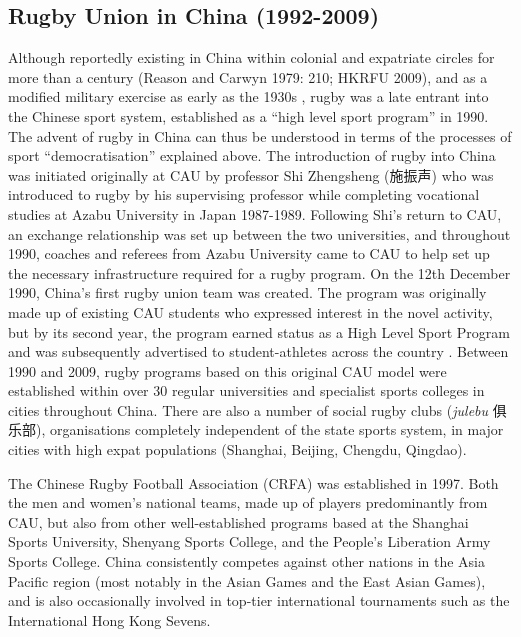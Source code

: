 {    \subsection{Rugby Union in China (1992-2009)}
Although reportedly existing in China within colonial and expatriate circles for more than a century (Reason and Carwyn 1979: 210; HKRFU 2009), and as a modified military exercise as early as the 1930s \citep[135]{Morris2004}, rugby was a late entrant into the Chinese sport system, established as a ``high level sport program'' in 1990.  The advent of rugby in China can thus be understood in terms of the processes of sport ``democratisation'' explained above.  The introduction of rugby into China was initiated originally at CAU by professor Shi Zhengsheng (施振声) who was introduced to rugby by his
supervising professor while completing vocational studies at Azabu University in Japan 1987-1989.  Following Shi’s return to CAU, an exchange relationship was set up between the two universities, and throughout 1990, coaches and referees from Azabu University came to CAU to help set up the necessary infrastructure required for a rugby program.  On the 12th December 1990, China’s first rugby union team was created.  The program was originally made up of existing CAU students who expressed interest in the novel activity, but by its second year, the program earned status as a High Level Sport Program and was subsequently advertised to student-athletes across the country \citep[2]{Xu2010}.  Between 1990 and 2009, rugby programs based on this original CAU model were established within over 30 regular universities and specialist sports colleges in cities throughout China.  There are also a number of social rugby clubs (\textit{julebu} 俱乐部), organisations completely independent of the state sports system, in major cities with high expat populations (Shanghai, Beijing, Chengdu, Qingdao).

The Chinese Rugby Football Association (CRFA) was established in 1997. Both the men and women’s national teams, made up of players predominantly from CAU, but also from other well-established programs based at the Shanghai Sports University, Shenyang Sports College, and the People’s Liberation Army Sports College. China consistently competes against other nations in the Asia Pacific region (most notably in the Asian Games and the East Asian Games), and is also occasionally involved in top-tier international tournaments such as the International Hong Kong Sevens.

}
